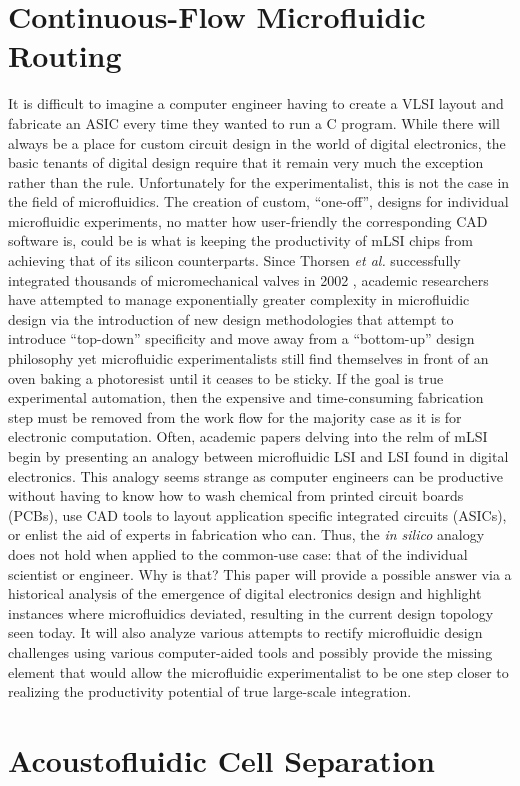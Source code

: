 \section{Continuous-Flow Microfluidic Routing}
\label{sec:backgroundCFRouting}

It is difficult to imagine a computer engineer having to create a VLSI layout and fabricate an ASIC every time they wanted to run a C program. While there will always be a place for custom circuit design in the world of digital electronics, the basic tenants of digital design require that it remain very much the exception rather than the rule. Unfortunately for the experimentalist, this is not the case in the field of microfluidics. The creation of custom, ``one-off'', designs for individual microfluidic experiments, no matter how user-friendly the corresponding CAD software is, could be is what is keeping the productivity of mLSI chips from achieving that of its silicon counterparts. Since Thorsen \emph{et al.} successfully integrated thousands of micromechanical valves in 2002 \cite{thorsen2002}, academic researchers have attempted to manage exponentially greater complexity in microfluidic design via the introduction of new design methodologies that attempt to introduce ``top-down'' specificity and move away from a ``bottom-up'' design philosophy \cite{minhass2013}\cite{melin2007}\cite{minhass2012} yet microfluidic experimentalists still find themselves in front of an oven baking a photoresist until it ceases to be sticky. If the goal is true experimental automation, then the expensive and time-consuming fabrication step must be removed from the work flow for the majority case as it is for electronic computation. Often, academic papers delving into the relm of mLSI begin by presenting an analogy between microfluidic LSI and LSI found in digital electronics. This analogy seems strange as computer engineers can be productive without having to know how to wash chemical from printed circuit boards (PCBs), use CAD tools to layout application specific integrated circuits (ASICs), or enlist the aid of experts in fabrication who can. Thus, the \emph{in silico} analogy does not hold when applied to the common-use case: that of the individual scientist or engineer. Why is that? This paper will provide a possible answer via a historical analysis of the emergence of digital electronics design and highlight instances where microfluidics deviated, resulting in the current design topology seen today. It will also analyze various attempts to rectify microfluidic design challenges using various computer-aided tools and possibly provide the missing element that would allow the microfluidic experimentalist to be one step closer to realizing the productivity potential of true large-scale integration. 



\section{Acoustofluidic Cell Separation}
\label{sec:cellSep}
